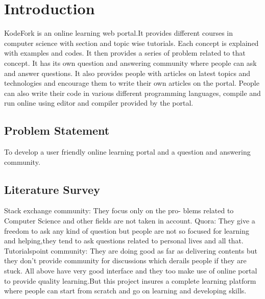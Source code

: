 \chapter{Introduction}

KodeFork is an online learning web portal.It provides different courses in computer science with section and topic wise tutorials. Each concept is explained with examples and codes. It then provides a series of problem related to that concept. It has its own question and answering community where people can ask and answer questions. It also provides people with articles on latest topics and technologies and encourage them to write their own articles on the portal. People can also write their code in various different programming languages, compile and run online using editor and compiler provided by the portal. 

\section{Problem Statement}
To develop a user friendly online learning portal and a
question and answering community.

\section{Literature Survey}
Stack exchange community: They focus only on the pro-
blems related to Computer Science and other fields are not
taken in account. Quora: They give a freedom to ask any
kind of question but people are not so focused for learning
and helping,they tend to ask questions related to personal
lives and all that. Tutorialspoint community: They are doing
good as far as delivering contents but they don’t provide
community for discussions which derails people if they are
stuck. All above have very good interface and they too make
use of online portal to provide quality learning.But this project
insures a complete learning platform where people can start
from scratch and go on learning and developing skills.
